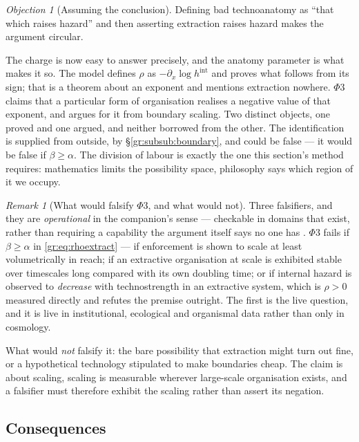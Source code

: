 \documentclass[11pt]{article}
\numberwithin{equation}{section}
\theoremstyle{plain}
\theoremstyle{definition}
\theoremstyle{remark}
\newtheorem{remark}[theorem]{Remark}
\newtheorem{objection}[theorem]{Objection}
\begin{document}
\begin{objection}[Assuming the conclusion]\label{gr:obj:circular}
Defining bad technoanatomy as ``that which raises hazard'' and then
asserting extraction raises hazard makes the argument circular.
\end{objection}

\noindent The charge is now easy to answer precisely, and the anatomy
parameter is what makes it so. The model defines $\rho$ as
$-\partial_x\log h^{\mathrm{int}}$ and proves what follows from its
sign; that is a theorem about an exponent and mentions extraction
nowhere. $\Phi3$ claims that a particular form of organisation realises
a negative value of that exponent, and argues for it from boundary
scaling. Two distinct objects, one proved and one argued, and neither
borrowed from the other. The identification is supplied from outside,
by \S\ref{gr:subsub:boundary}, and could be false --- it would be false
if $\beta\ge\alpha$. The division of labour is exactly the one this section's method
requires: mathematics limits the possibility space, philosophy says
which region of it we occupy.

\begin{remark}[What would falsify $\Phi3$, and what would not]
\label{gr:rem:falsify}
Three falsifiers, and they are \emph{operational} in the companion's
sense --- checkable in domains that exist, rather than requiring a
capability the argument itself says no one has \cite{Ben26Optimal}.
$\Phi3$ fails if $\beta\ge\alpha$ in \eqref{gr:eq:rhoextract} --- if
enforcement is shown to scale at least volumetrically in reach; if an
extractive organisation at scale is exhibited stable over timescales
long compared with its own doubling time; or if internal hazard is
observed to \emph{decrease} with technostrength in an extractive system,
which is $\rho>0$ measured directly and refutes the premise outright. The first
is the live question, and it is live in institutional, ecological and
organismal data rather than only in cosmology.

What would \emph{not} falsify it: the bare possibility that extraction
might turn out fine, or a hypothetical technology stipulated to make
boundaries cheap. The claim is about scaling, scaling is measurable
wherever large-scale organisation exists, and a falsifier must therefore
exhibit the scaling rather than assert its negation.
\end{remark}

\subsection{Consequences}\label{gr:sub:consequences}
\end{document}
